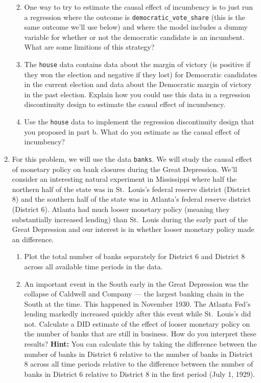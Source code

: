 \documentclass[
  letterpaper,
  DIV=11,
  numbers=noendperiod]{scrreprt}
\begin{document}
\begin{enumerate}
  \begin{enumerate}
  \def\labelenumii{\alph{enumii})}
  \item
    One way to try to estimate the causal effect of incumbency is to
    just run a regression where the outcome is
    \texttt{democratic\_vote\_share} (this is the same outcome we'll use
    below) and where the model includes a dummy variable for whether or
    not the democratic candidate is an incumbent. What are some
    limitions of this strategy?
  \item
    The \texttt{house} data contains data about the margin of victory
    (is positive if they won the election and negative if they lost) for
    Democratic candidates in the current election and data about the
    Democratic margin of victory in the past election. Explain how you
    could use this data in a regression discontinuity design to estimate
    the causal effect of incumbency.
  \item
    Use the \texttt{house} data to implement the regression
    discontinuity design that you proposed in part b. What do you
    estimate as the causal effect of incumbency?
  \end{enumerate}
\item
  For this problem, we will use the data \texttt{banks}. We will study
  the causal effect of monetary policy on bank closures during the Great
  Depression. We'll consider an interesting natural experiment in
  Mississippi where half the northern half of the state was in
  St.~Louis's federal reserve district (District 8) and the southern
  half of the state was in Atlanta's federal reserve district (District
  6). Atlanta had much looser monetary policy (meaning they
  substantially increased lending) than St.~Louis during the early part
  of the Great Depression and our interest is in whether looser monetary
  policy made an difference.

  \begin{enumerate}
  \def\labelenumii{\alph{enumii})}
  \item
    Plot the total number of banks separately for District 6 and
    District 8 across all available time periods in the data.
  \item
    An important event in the South early in the Great Depression was
    the collapse of Caldwell and Company --- the largest banking chain
    in the South at the time. This happened in November 1930. The
    Atlanta Fed's lending markedly increased quickly after this event
    while St.~Louis's did not. Calculate a DID estimate of the effect of
    looser monetary policy on the number of banks that are still in
    business. How do you interpret these results? \textbf{Hint:} You can
    calculate this by taking the difference between the number of banks
    in District 6 relative to the number of banks in District 8 across
    all time periods relative to the difference between the number of
    banks in District 6 relative to District 8 in the first period (July
    1, 1929).
  \end{enumerate}
\end{enumerate}
\end{document}
